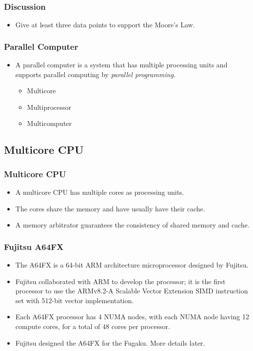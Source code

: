 \documentclass{beamer}
\begin{document}
\begin{CJK}{UTF8}{bsmi}
  \begin{frame}
    \frametitle{Discussion} 
    \begin{itemize}
    \item Give at least three data points to support the Moore's Law.
    \end{itemize}
  \end{frame}


  \begin{frame}
    \frametitle{Parallel Computer} 
    \begin{itemize}
    \item A parallel computer is a system that has multiple processing
      units and supports parallel computing by {\em parallel programming}.
      \begin{itemize}
      \item Multicore
      \item Multiprocessor
      \item Multicomputer
      \end{itemize}
    \end{itemize}
  \end{frame}


  \subsection{Multicore CPU}

  \begin{frame}
    \frametitle{Multicore CPU}
    \begin{itemize}
    \item A multicore CPU has multiple cores as processing units.
    \item The cores share the memory and have usually have their cache.
    \item A memory arbitrator guarantees the consistency of shared memory
      and cache.
    \end{itemize}
  \end{frame}

  \begin{frame}
    \frametitle{Fujitsu A64FX}
    \begin{itemize}
    \item The A64FX is a 64-bit ARM architecture microprocessor
      designed by Fujitsu.
    \item Fujitsu collaborated with ARM to develop the processor; it is
      the first processor to use the ARMv8.2-A Scalable Vector Extension
      SIMD instruction set with 512-bit vector implementation.
    \item Each A64FX processor has 4 NUMA nodes, with each NUMA node
      having 12 compute cores, for a total of 48 cores per processor.
    \item Fujitsu designed the A64FX for the Fugaku.  More details later.
    \end{itemize}
  \end{frame}




\end{CJK}
\end{document}
